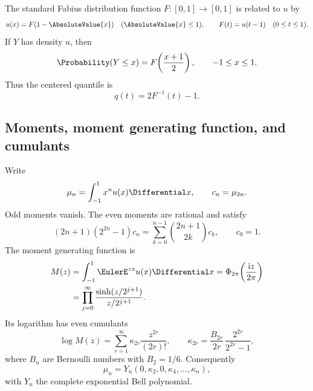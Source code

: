 The standard Fabius distribution function $F:[0,1]\to[0,1]$ is related to $u$ by
\begin{equation}
 u(x)=F(1-\AbsoluteValue{x})\quad (\AbsoluteValue{x}\le1),
 \qquad
 F(t)=u(t-1)\quad(0\le t\le1).
 \label{is:p3:eq:F-up-relation}
\end{equation}
If $Y$ has density $u$, then
\begin{equation}
 \Probability(Y\le x)=F\!\left(\frac{x+1}{2}\right),
 \qquad -1\le x\le1.
 \label{is:p3:eq:centered-CDF}
\end{equation}
Thus the centered quantile is
\begin{equation}
 q(t)=2F^{-1}(t)-1.
 \label{is:p3:eq:centered-quantile}
\end{equation}

\subsection{Moments, moment generating function, and cumulants}

Write
\begin{equation}
 \mu_n=\int_{-1}^{1}x^n u(x)\Differential x,
 \qquad c_n=\mu_{2n}.
 \label{is:p3:eq:moments}
\end{equation}
Odd moments vanish.  The even moments are rational and satisfy
\begin{equation}
 (2n+1)(2^{2n}-1)c_n
 =\sum_{k=0}^{n-1}\binom{2n+1}{2k}c_k,
 \qquad c_0=1.
 \label{is:p3:eq:moment-recurrence}
\end{equation}
The moment generating function is
\begin{align}
 M(z)
 &=\int_{-1}^{1}\EulerE^{zx}u(x)\Differential x
 =\PhiCyc\!\left(\frac{\iu z}{2\pi}\right)\notag\\
 &=\prod_{j=0}^{\infty}
 \frac{\sinh(z/2^{j+1})}{z/2^{j+1}}.
 \label{is:p3:eq:mgf-product}
\end{align}
Its logarithm has even cumulants
\begin{equation}
 \log M(z)=\sum_{r=1}^{\infty}\kappa_{2r}\frac{z^{2r}}{(2r)!},
 \qquad
 \boxed{\displaystyle
 \kappa_{2r}=\frac{B_{2r}}{2r}\,
 \frac{2^{2r}}{2^{2r}-1}},
 \label{is:p3:eq:cumulants}
\end{equation}
where $B_n$ are Bernoulli numbers with $B_2=1/6$.  Consequently
\begin{equation}
 \mu_n=Y_n(0,\kappa_2,0,\kappa_4,\ldots,\kappa_n),
 \label{is:p3:eq:moment-Bell}
\end{equation}
with $Y_n$ the complete exponential Bell polynomial.

